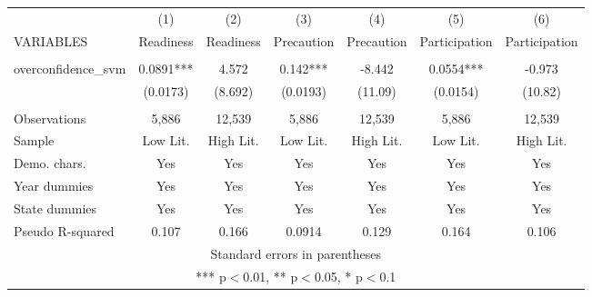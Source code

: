 \documentclass[]{article}
\begin{document}
\begin{tabular}{lcccccc} \hline
 & (1) & (2) & (3) & (4) & (5) & (6) \\
VARIABLES & Readiness & Readiness & Precaution & Precaution & Participation & Participation \\ \hline
 &  &  &  &  &  &  \\
overconfidence\_svm & 0.0891*** & 4.572 & 0.142*** & -8.442 & 0.0554*** & -0.973 \\
 & (0.0173) & (8.692) & (0.0193) & (11.09) & (0.0154) & (10.82) \\
 &  &  &  &  &  &  \\
Observations & 5,886 & 12,539 & 5,886 & 12,539 & 5,886 & 12,539 \\
Sample & Low Lit. & High Lit. & Low Lit. & High Lit. & Low Lit. & High Lit. \\
Demo. chars. & Yes & Yes & Yes & Yes & Yes & Yes \\
Year dummies & Yes & Yes & Yes & Yes & Yes & Yes \\
State dummies & Yes & Yes & Yes & Yes & Yes & Yes \\
 Pseudo R-squared & 0.107 & 0.166 & 0.0914 & 0.129 & 0.164 & 0.106 \\ \hline
\multicolumn{7}{c}{ Standard errors in parentheses} \\
\multicolumn{7}{c}{ *** p$<$0.01, ** p$<$0.05, * p$<$0.1} \\
\end{tabular}
\end{document}
